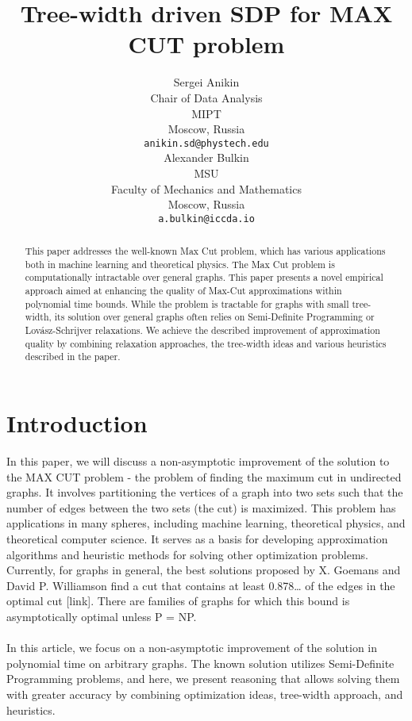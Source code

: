 \documentclass{article}
\author{ Sergei Anikin \\
	Chair of Data Analysis\\
	MIPT\\
    Moscow, Russia\\
	\texttt{anikin.sd@phystech.edu} \\
	\And
	Alexander Bulkin \\
	MSU \\
    Faculty of Mechanics and Mathematics \\
	Moscow, Russia\\
    \texttt{a.bulkin@iccda.io} \\
}
\date{}
\begin{document}
\title{Tree-width driven SDP for MAX CUT problem
}
\maketitle
\begin{abstract}
	This paper addresses the well-known Max Cut problem, which has various applications both in machine learning and theoretical physics. The Max Cut problem is computationally intractable over general graphs. This paper presents a novel empirical approach aimed at enhancing the quality of Max-Cut approximations within polynomial time bounds. While the problem is tractable for graphs with small tree-width, its solution over general graphs often relies on Semi-Definite Programming or Lovász-Schrijver relaxations. We achieve the described improvement of approximation quality by combining relaxation approaches, the tree-width ideas and various heuristics described in the paper.




\end{abstract}



\section{Introduction}
In this paper, we will discuss a non-asymptotic improvement of the solution to the MAX CUT problem - the problem of finding the maximum cut in  undirected graphs. It involves partitioning the vertices of a graph into two sets such that the number of edges between the two sets (the cut) is maximized. This problem has applications in many spheres, including machine learning, theoretical physics, and theoretical computer science. It serves as a basis for developing approximation algorithms and heuristic methods for solving other optimization problems. Currently, for graphs in general, the best solutions proposed by X. Goemans and David P. Williamson find a cut that contains at least 0.878… of the edges in the optimal cut [link]. There are families of graphs for which this bound is asymptotically optimal unless P = NP.
\\
\\
In this article, we focus on a non-asymptotic improvement of the solution in polynomial time on arbitrary graphs. The known solution utilizes Semi-Definite Programming problems, and here, we present reasoning that allows solving them with greater accuracy by combining optimization ideas, tree-width approach, and heuristics.
\end{document}
